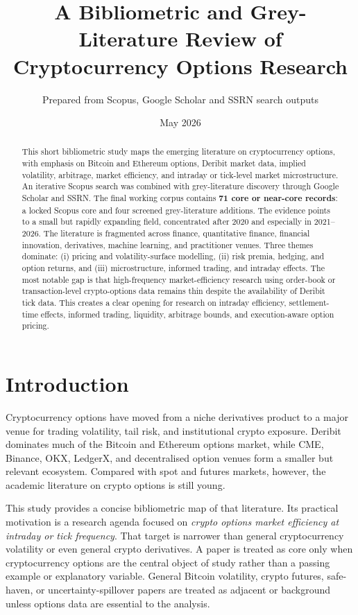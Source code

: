 \documentclass[11pt,a4paper]{article}
\title{\textbf{A Bibliometric and Grey-Literature Review of Cryptocurrency Options Research}}
\author{Prepared from Scopus, Google Scholar and SSRN search outputs}
\date{May 2026}
\begin{document}
\maketitle

\begin{abstract}
This short bibliometric study maps the emerging literature on cryptocurrency options, with emphasis on Bitcoin and Ethereum options, Deribit market data, implied volatility, arbitrage, market efficiency, and intraday or tick-level market microstructure. An iterative Scopus search was combined with grey-literature discovery through Google Scholar and SSRN. The final working corpus contains \textbf{71 core or near-core records}: a locked Scopus core and four screened grey-literature additions. The evidence points to a small but rapidly expanding field, concentrated after 2020 and especially in 2021--2026. The literature is fragmented across finance, quantitative finance, financial innovation, derivatives, machine learning, and practitioner venues. Three themes dominate: (i) pricing and volatility-surface modelling, (ii) risk premia, hedging, and option returns, and (iii) microstructure, informed trading, and intraday effects. The most notable gap is that high-frequency market-efficiency research using order-book or transaction-level crypto-options data remains thin despite the availability of Deribit tick data. This creates a clear opening for research on intraday efficiency, settlement-time effects, informed trading, liquidity, arbitrage bounds, and execution-aware option pricing.
\end{abstract}

\section{Introduction}

Cryptocurrency options have moved from a niche derivatives product to a major venue for trading volatility, tail risk, and institutional crypto exposure. Deribit dominates much of the Bitcoin and Ethereum options market, while CME, Binance, OKX, LedgerX, and decentralised option venues form a smaller but relevant ecosystem. Compared with spot and futures markets, however, the academic literature on crypto options is still young.

This study provides a concise bibliometric map of that literature. Its practical motivation is a research agenda focused on \emph{crypto options market efficiency at intraday or tick frequency}. That target is narrower than general cryptocurrency volatility or even general crypto derivatives. A paper is treated as core only when cryptocurrency options are the central object of study rather than a passing example or explanatory variable. General Bitcoin volatility, crypto futures, safe-haven, or uncertainty-spillover papers are treated as adjacent or background unless options data are essential to the analysis.
\end{document}
